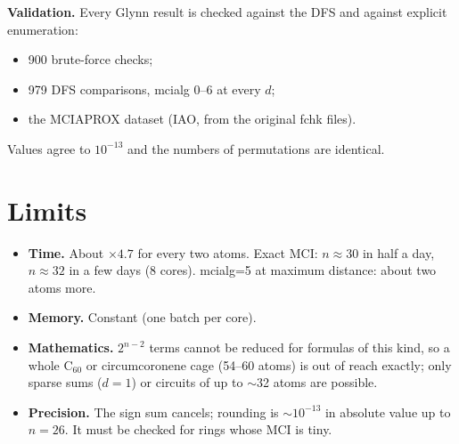 \documentclass[11pt,a4paper]{article}
\begin{document}
\textbf{Validation.} Every Glynn result is checked against the DFS and against explicit enumeration:
\begin{itemize}\itemsep0pt
\item 900 brute-force checks;
\item 979 DFS comparisons, mcialg 0--6 at every $d$;
\item the MCIAPROX dataset (IAO, from the original fchk files).
\end{itemize}
Values agree to $10^{-13}$ and the numbers of permutations are identical.

\section{Limits}
\begin{itemize}\itemsep0pt
\item \textbf{Time.} About $\times4.7$ for every two atoms. Exact MCI: $n\approx30$ in half a day, $n\approx32$ in a few
      days (8 cores). mcialg=5 at maximum distance: about two atoms more.
\item \textbf{Memory.} Constant (one batch per core).
\item \textbf{Mathematics.} $2^{n-2}$ terms cannot be reduced for formulas of this kind, so a whole C$_{60}$ or
      circumcoronene cage (54--60 atoms) is out of reach exactly; only sparse sums ($d=1$) or circuits of up to $\sim$32
      atoms are possible.
\item \textbf{Precision.} The sign sum cancels; rounding is $\sim10^{-13}$ in absolute value up to $n=26$. It must be
      checked for rings whose MCI is tiny.
\end{itemize}
\end{document}
